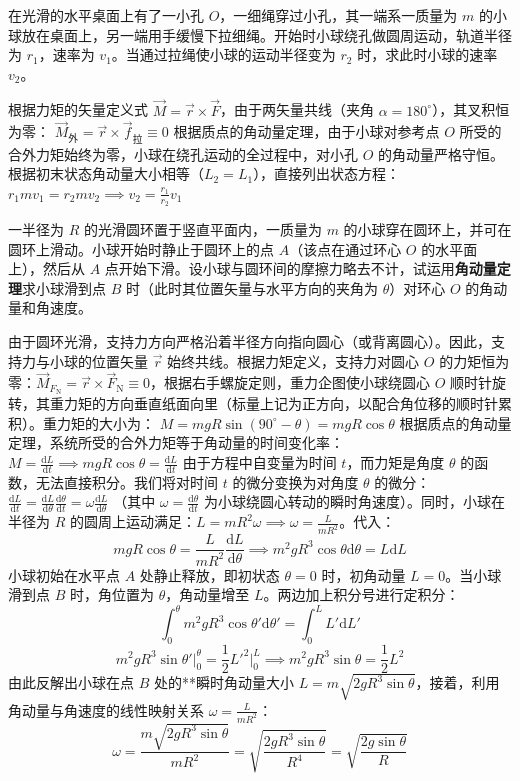 \documentclass[lang=cn,11pt]{elegantbook}
\begin{document}
\begin{exercise}
在光滑的水平桌面上有了一小孔 $O$，一细绳穿过小孔，其一端系一质量为 $m$ 的小球放在桌面上，另一端用手缓慢下拉细绳。开始时小球绕孔做圆周运动，轨道半径为 $r_1$，速率为 $v_1$。当通过拉绳使小球的运动半径变为 $r_2$ 时，求此时小球的速率 $v_2$。
\end{exercise}
\begin{solution}
根据力矩的矢量定义式 $\vec{M} = \vec{r} \times \vec{F}$，由于两矢量共线（夹角 $\alpha = 180^\circ$），其叉积恒为零：
 \(\vec{M}_{\text{外}} = \vec{r} \times \vec{f}_{\text{拉}} \equiv 0\) 根据质点的角动量定理，由于小球对参考点 $O$ 所受的合外力矩始终为零，小球在绕孔运动的全过程中，对小孔 $O$ 的角动量严格守恒。根据初末状态角动量大小相等（$L_2 = L_1$），直接列出状态方程：
 \(r_1 m v_1 = r_2 m v_2 \implies \boxed{v_2 = \frac{r_1}{r_2} v_1}\) 
\end{solution}

\begin{exercise}
一半径为 $R$ 的光滑圆环置于竖直平面内，一质量为 $m$ 的小球穿在圆环上，并可在圆环上滑动。小球开始时静止于圆环上的点 $A$（该点在通过环心 $O$ 的水平面上），然后从 $A$ 点开始下滑。设小球与圆环间的摩擦力略去不计，试运用\textbf{角动量定理}求小球滑到点 $B$ 时（此时其位置矢量与水平方向的夹角为 $\theta$）对环心 $O$ 的角动量和角速度。
\end{exercise}
\begin{solution}
由于圆环光滑，支持力方向严格沿着半径方向指向圆心（或背离圆心）。因此，支持力与小球的位置矢量 $\vec{r}$ 始终共线。根据力矩定义，支持力对圆心 $O$ 的力矩恒为零：$\vec{M}_{F_{\text{N}}} = \vec{r} \times \vec{F}_{\text{N}} \equiv 0$，根据右手螺旋定则，重力企图使小球绕圆心 $O$ 顺时针旋转，其重力矩的方向垂直纸面向里（标量上记为正方向，以配合角位移的顺时针累积）。重力矩的大小为：
 \(M = mgR\sin(90^\circ - \theta) = mgR\cos\theta\) 根据质点的角动量定理，系统所受的合外力矩等于角动量的时间变化率：
 \(M = \frac{\mathrm{d}L}{\mathrm{d}t} \implies mgR\cos\theta = \frac{\mathrm{d}L}{\mathrm{d}t}\) 
由于方程中自变量为时间 $t$，而力矩是角度 $\theta$ 的函数，无法直接积分。我们将对时间 $t$ 的微分变换为对角度 $\theta$ 的微分：
 \(\frac{\mathrm{d}L}{\mathrm{d}t} = \frac{\mathrm{d}L}{\mathrm{d}\theta} \frac{\mathrm{d}\theta}{\mathrm{d}t} = \omega \frac{\mathrm{d}L}{\mathrm{d}\theta}\) 
（其中 $\omega = \frac{\mathrm{d}\theta}{\mathrm{d}t}$ 为小球绕圆心转动的瞬时角速度）。同时，小球在半径为 $R$ 的圆周上运动满足：$L = mR^2\omega \implies \omega = \frac{L}{mR^2}$。代入：
\[
mgR\cos\theta = \frac{L}{mR^2} \frac{\mathrm{d}L}{\mathrm{d}\theta} \implies m^2gR^3\cos\theta\mathrm{d}\theta = L\mathrm{d}L
\]小球初始在水平点 $A$ 处静止释放，即初状态 $\theta = 0$ 时，初角动量 $L = 0$。当小球滑到点 $B$ 时，角位置为 $\theta$，角动量增至 $L$。两边加上积分号进行定积分：
\[
\int_{0}^{\theta} m^2gR^3\cos\theta' \mathrm{d}\theta' = \int_{0}^{L} L'\mathrm{d}L'
\]
\[
m^2gR^3\sin\theta' \Big|_0^\theta = \frac{1}{2}L'^2 \Big|_0^L \implies m^2gR^3\sin\theta = \frac{1}{2}L^2
\]
由此反解出小球在点 $B$ 处的**瞬时角动量大小 $L= m\sqrt{2gR^3\sin\theta}$，接着，利用角动量与角速度的线性映射关系 $\omega = \frac{L}{mR^2}$：
\[
\omega = \frac{m\sqrt{2gR^3\sin\theta}}{mR^2} = \sqrt{\frac{2gR^3\sin\theta}{R^4}} = \boxed{\sqrt{\frac{2g\sin\theta}{R}}}
\]
\end{solution}
\end{document}
